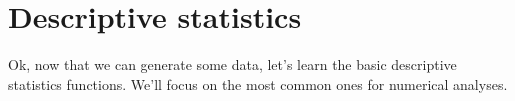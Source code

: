 \documentclass{tufte-book}\usepackage[]{graphicx}\usepackage[]{color}
\begin{document}

\section{Descriptive statistics}

Ok, now that we can generate some data, let's learn the basic descriptive statistics functions. We'll focus on the most common ones for numerical analyses.
\end{document}
